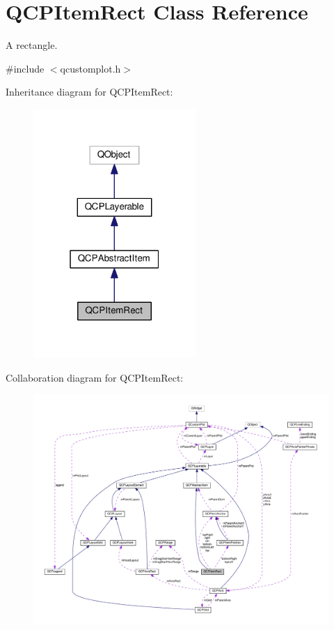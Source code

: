\hypertarget{classQCPItemRect}{}\section{Q\+C\+P\+Item\+Rect Class Reference}
\label{classQCPItemRect}


A rectangle.  




{\ttfamily \#include $<$qcustomplot.\+h$>$}



Inheritance diagram for Q\+C\+P\+Item\+Rect\+:\nopagebreak
\begin{figure}[H]
\begin{center}
\leavevmode
\includegraphics[width=175pt]{classQCPItemRect__inherit__graph}
\end{center}
\end{figure}


Collaboration diagram for Q\+C\+P\+Item\+Rect\+:\nopagebreak
\begin{figure}[H]
\begin{center}
\leavevmode
\includegraphics[width=350pt]{classQCPItemRect__coll__graph}
\end{center}
\end{figure}
